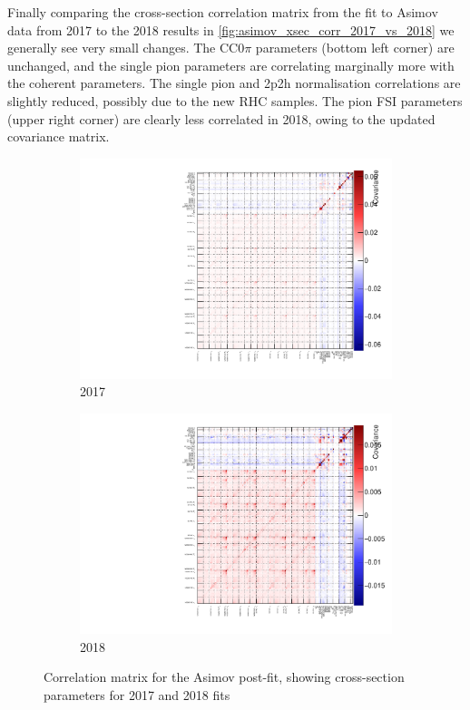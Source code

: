 Finally comparing the cross-section correlation matrix from the fit to Asimov data from 2017 to the 2018 results in \autoref{fig:asimov_xsec_corr_2017_vs_2018} we generally see very small changes. The CC0$\pi$ parameters (bottom left corner) are unchanged, and the single pion parameters are correlating marginally more with the coherent parameters. The single pion and 2p2h normalisation correlations are slightly reduced, possibly due to the new RHC \numubar samples. The pion FSI parameters (upper right corner) are clearly less correlated in 2018, owing to the updated covariance matrix.
\begin{figure}[h]
	\begin{subfigure}[t]{0.49\textwidth}
		\includegraphics[width=\textwidth, trim={0mm 0mm 0mm 0mm}, clip,page=12]{figures/mach3/Asimov/2017b_NewDet_NewData_Asimov_Long_0_drawCorr.pdf}
		\caption{2017}
	\end{subfigure}
	\begin{subfigure}[t]{0.49\textwidth}
		\includegraphics[width=\textwidth, trim={0mm 0mm 0mm 0mm}, clip,page=12]{figures/mach3/2018/asimov/corr/2018a_MultiPi_Binningv6_NewCov_Asimov_merge_drawCorr}
		\caption{2018}
	\end{subfigure}
	\caption{Correlation matrix for the Asimov post-fit, showing cross-section parameters for 2017 and 2018 fits}
	\label{fig:asimov_xsec_corr_2017_vs_2018}
\end{figure}

